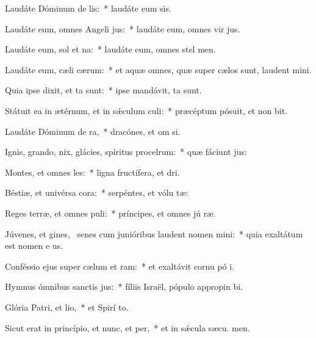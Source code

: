 \item Laudáte Dóminum de lis:~* laudáte eum  sis.
\item Laudáte eum, omnes Angeli jus:~* laudáte eum, omnes vir jus.
\item Laudáte eum, sol et na:~* laudáte eum, omnes stel  men.
\item Laudáte eum, cæli cærum:~* et aquæ omnes, quæ super cælos sunt, laudent  mini.
\item Quia ipse dixit, et ta sunt:~* ipse mandávit,  ta sunt.
\item Státuit ea in ætérnum, et in sǽculum culi:~* præcéptum pósuit, et non bit.
\item Laudáte Dóminum de ra,~* dracónes, et om si.
\item Ignis, grando, nix, glácies, spíritus procelrum:~* quæ fáciunt  jus:
\item Montes, et omnes les:~* ligna fructífera, et  dri.
\item Béstiæ, et univérsa cora:~* serpéntes, et vólu tæ:
\item Reges terræ, et omnes puli:~* príncipes, et omnes jú ræ.
\item Júvenes, et gines,~\pscross{} senes cum junióribus laudent nomen mini:~* quia exaltátum est nomen e us.
\item Conféssio ejus super cælum et ram:~* et exaltávit cornu pó i.
\item Hymnus ómnibus sanctis jus:~* fíliis Israël, pópulo appropin bi.
\item Glória Patri, et lio,~* et Spirí to.
\item Sicut erat in princípio, et nunc, et per,~* et in sǽcula sæcu. men.

